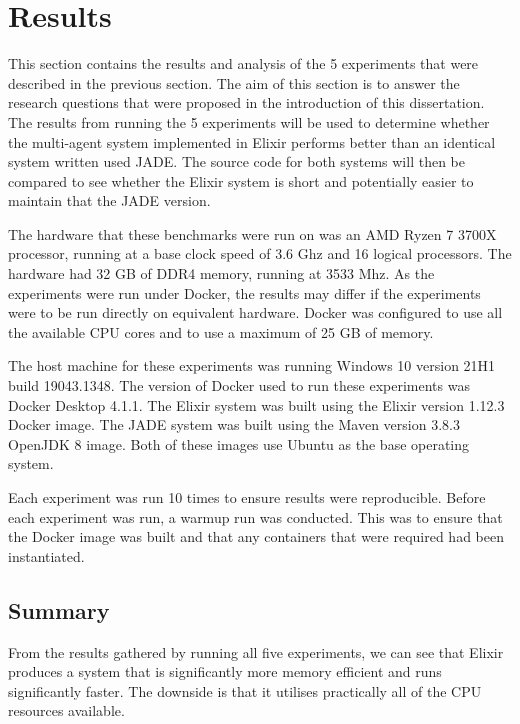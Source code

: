 \section{Results}

This section contains the results and analysis of the 5 experiments that were described in the previous section.
The aim of this section is to answer the research questions that were proposed in the introduction of this dissertation.
The results from running the 5 experiments will be used to determine whether the multi-agent system implemented in Elixir performs better than an identical system written used JADE\@.
The source code for both systems will then be compared to see whether the Elixir system is short and potentially easier to maintain that the JADE version.

The hardware that these benchmarks were run on was an AMD Ryzen 7 3700X processor, running at a base clock speed of 3.6 Ghz and 16 logical processors.
The hardware had 32 GB of DDR4 memory, running at 3533 Mhz.
As the experiments were run under Docker, the results may differ if the experiments were to be run directly on equivalent hardware.
Docker was configured to use all the available CPU cores and to use a maximum of 25 GB of memory.

The host machine for these experiments was running Windows 10 version 21H1 build 19043.1348.
The version of Docker used to run these experiments was Docker Desktop 4.1.1.
The Elixir system was built using the Elixir version 1.12.3 Docker image.
The JADE system was built using the Maven version 3.8.3 OpenJDK 8 image.
Both of these images use Ubuntu as the base operating system.

Each experiment was run 10 times to ensure results were reproducible.
Before each experiment was run, a warmup run was conducted.
This was to ensure that the Docker image was built and that any containers that were required had been instantiated.









\subsection{Summary}

From the results gathered by running all five experiments, we can see that Elixir produces a system that is significantly more memory efficient and runs significantly faster.
The downside is that it utilises practically all of the CPU resources available.

